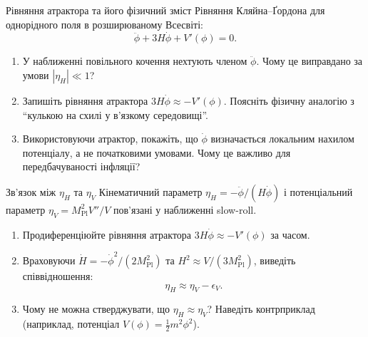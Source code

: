 
\begin{problem}{Рівняння атрактора та його фізичний зміст}
Рівняння Кляйна--Ґордона для однорідного поля в розширюваному Всесвіті:
\[
\ddot{\phi} + 3H\dot{\phi} + V'(\phi) = 0.
\]

\begin{enumerate}
    \item У наближенні повільного кочення нехтують членом $\ddot{\phi}$.
          Чому це виправдано за умови $|\eta_H| \ll 1$?
    \item Запишіть рівняння атрактора $3H\dot{\phi} \approx -V'(\phi)$.
          Поясніть фізичну аналогію з \enquote{кулькою на схилі у в'язкому середовищі}.
    \item Використовуючи атрактор, покажіть, що $\dot{\phi}$ визначається локальним
          нахилом потенціалу, а не початковими умовами. Чому це важливо для
          передбачуваності інфляції?
\end{enumerate}
\end{problem}


\begin{problem}{Зв'язок між $\eta_H$ та $\eta_V$}
Кінематичний параметр $\eta_H = -\ddot{\phi}/(H\dot{\phi})$ і потенціальний параметр
$\eta_V = M_{\mathrm{Pl}}^2 V''/V$ пов'язані у наближенні slow-roll.

\begin{enumerate}
    \item Продиференціюйте рівняння атрактора $3H\dot{\phi} \approx -V'(\phi)$ за часом.
    \item Враховуючи $\dot{H} = -\dot{\phi}^2/(2M_{\mathrm{Pl}}^2)$ та $H^2 \approx V/(3M_{\mathrm{Pl}}^2)$,
          виведіть співвідношення:
          \[
          \eta_H \approx \eta_V - \epsilon_V.
          \]
    \item Чому не можна стверджувати, що $\eta_H \approx \eta_V$? Наведіть контрприклад
          (наприклад, потенціал $V(\phi) = \frac{1}{2}m^2\phi^2$).
\end{enumerate}
\end{problem}



